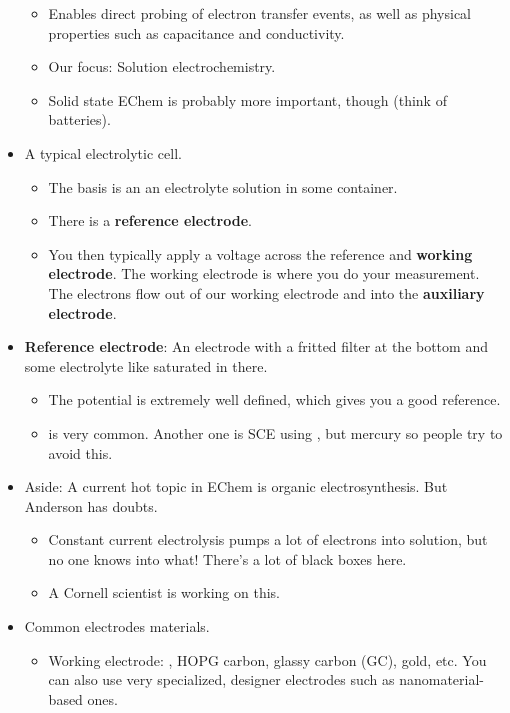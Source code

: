 \documentclass[../notes.tex]{subfiles}
\begin{document}
\begin{itemize}
\begin{itemize}
        \item Enables direct probing of electron transfer events, as well as physical properties such as capacitance and conductivity.
        \item Our focus: Solution electrochemistry.
        \item Solid state EChem is probably more important, though (think of batteries).
    \end{itemize}
    \item A typical electrolytic cell.
    \begin{itemize}
        \item The basis is an an electrolyte solution in some container.
        \item There is a \textbf{reference electrode}.
        \item You then typically apply a voltage across the reference and \textbf{working electrode}. The working electrode is where you do your measurement. The electrons flow out of our working electrode and into the \textbf{auxiliary electrode}.
    \end{itemize}
    \item \textbf{Reference electrode}: An electrode with a fritted filter at the bottom and some electrolyte like saturated  in there.
    \begin{itemize}
        \item The potential is extremely well defined, which gives you a good reference.
        \item {} is very common. Another one is SCE using , but mercury so people try to avoid this.
    \end{itemize}
    \item Aside: A current hot topic in EChem is organic electrosynthesis. But Anderson has doubts.
    \begin{itemize}
        \item Constant current electrolysis pumps a lot of electrons into solution, but no one knows into what! There's a lot of black boxes here.
        \item A Cornell scientist is working on this.
    \end{itemize}
    \item Common electrodes materials.
    \begin{itemize}
        \item Working electrode: , HOPG carbon, glassy carbon (GC), gold, etc. You can also use very specialized, designer electrodes such as nanomaterial-based ones.

\end{itemize}
\end{itemize}
\end{document}
